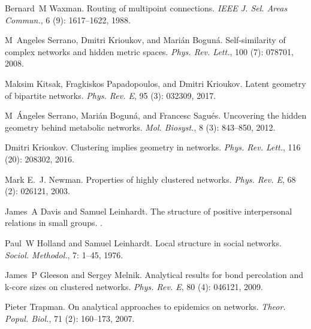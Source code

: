 Bernard~M Waxman.
\newblock Routing of multipoint connections.
\newblock \emph{IEEE J. Sel. Areas Commun.}, 6 (9):
1617--1622, 1988.

M~Angeles Serrano, Dmitri Krioukov, and Mari{\'a}n Bogun{\'a}.
\newblock Self-similarity of complex networks and hidden metric spaces.
\newblock \emph{Phys. Rev. Lett.}, 100 (7): 078701, 2008.

Maksim Kitsak, Fragkiskos Papadopoulos, and Dmitri Krioukov.
\newblock Latent geometry of bipartite networks.
\newblock \emph{Phys. Rev. E}, 95 (3): 032309, 2017.

M~{\'A}ngeles Serrano, Mari{\'a}n Bogun{\'a}, and Francesc Sagu{\'e}s.
\newblock Uncovering the hidden geometry behind metabolic networks.
\newblock \emph{Mol. Biosyst.}, 8 (3): 843--850, 2012.

Dmitri Krioukov.
\newblock Clustering implies geometry in networks.
\newblock \emph{Phys. Rev. Lett.}, 116 (20): 208302, 2016.

Mark E.~J. Newman.
\newblock Properties of highly clustered networks.
\newblock \emph{Phys. Rev. E}, 68 (2): 026121,
2003{}.

James~A Davis and Samuel Leinhardt.
\newblock The structure of positive interpersonal relations in small groups.
.

Paul~W Holland and Samuel Leinhardt.
\newblock Local structure in social networks.
\newblock \emph{Sociol. Methodol.}, 7: 1--45, 1976.

James~P Gleeson and Sergey Melnik.
\newblock Analytical results for bond percolation and k-core sizes on clustered
networks.
\newblock \emph{Phys. Rev. E}, 80 (4): 046121, 2009.

Pieter Trapman.
\newblock On analytical approaches to epidemics on networks.
\newblock \emph{Theor. Popul. Biol.}, 71 (2): 160--173, 2007.


